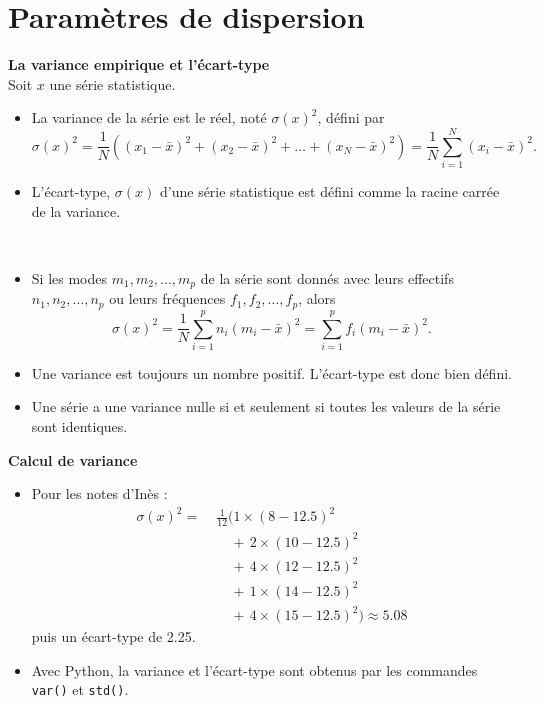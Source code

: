 \documentclass[../PolyS4.tex]{subfiles}
\begin{document}
\section{Paramètres de dispersion}

\begin{Def}\textbf{La variance empirique et l'écart-type}\\

Soit $x$ une série statistique.
\begin{itemize}
    \item La variance de la série est le réel, noté $\sigma(x)^2$, défini par
    \[
    \sigma(x)^2 = \frac{1}{N} \left( (x_1 - \bar x)^2 + (x_2 - \bar x)^2 + \ldots + (x_N - \bar x)^2 \right) = \frac{1}{N} \sum_{i=1}^{N} (x_i -  \bar x)^2.
    \]
    \item L'écart-type, $\sigma(x)$ d'une série statistique est défini comme la racine carrée de la variance.
\end{itemize}
\end{Def}

\begin{Rmq}$\,$

\begin{itemize}
    \item Si les modes $m_1, m_2, \ldots, m_p$ de la série sont donnés avec leurs effectifs $n_1, n_2, \ldots, n_p$ ou leurs fréquences $f_1, f_2, \ldots, f_p$, alors
    \[
    \sigma(x)^2 = \frac{1}{N} \sum_{i=1}^{p} n_i (m_i - \bar{x})^2 = \sum_{i=1}^{p} f_i (m_i - \bar{x})^2.
    \]
    \item Une variance est toujours un nombre positif. L'écart-type est donc bien défini.
    \item Une série a une variance nulle si et seulement si toutes les valeurs de la série sont identiques.
\end{itemize}
\end{Rmq}

\begin{Ex}\textbf{Calcul de variance}\\

\begin{itemize}
    \item Pour les notes d'Inès :
    \[
    \begin{aligned}
        \sigma(x)^2 =\; & \frac{1}{12} \bigg(
            1 \times (8 - 12.5)^2 \\
        &\quad +\, 2 \times (10 - 12.5)^2 \\
        &\quad +\, 4 \times (12 - 12.5)^2 \\
        &\quad +\, 1 \times (14 - 12.5)^2 \\
        &\quad +\, 4 \times (15 - 12.5)^2
        \bigg)
        \approx 5.08
    \end{aligned}
    \]
    puis un écart-type de 2.25.
    
    \item Avec Python, la variance et l'écart-type sont obtenus par les commandes \texttt{var()} et \texttt{std()}.
\end{itemize}
\end{Ex}
\end{document}

